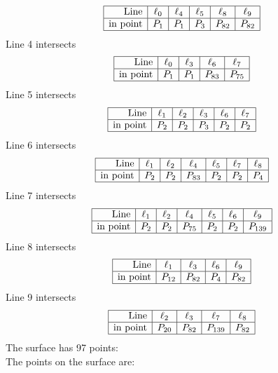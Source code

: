 \documentclass{article}
\begin{document}
{$$\begin{array}{|r*{5}{|c}|}
\hline
\mbox{Line}  & \ell_{0} & \ell_{4} & \ell_{5} & \ell_{8} & \ell_{9}\\
\hline
\mbox{in point}  & P_{1} & P_{1} & P_{3} & P_{82} & P_{82}\\
\hline
\end{array}
$$
Line 4 intersects 
$$
\begin{array}{|r*{4}{|c}|}
\hline
\mbox{Line}  & \ell_{0} & \ell_{3} & \ell_{6} & \ell_{7}\\
\hline
\mbox{in point}  & P_{1} & P_{1} & P_{83} & P_{75}\\
\hline
\end{array}
$$
Line 5 intersects 
$$
\begin{array}{|r*{5}{|c}|}
\hline
\mbox{Line}  & \ell_{1} & \ell_{2} & \ell_{3} & \ell_{6} & \ell_{7}\\
\hline
\mbox{in point}  & P_{2} & P_{2} & P_{3} & P_{2} & P_{2}\\
\hline
\end{array}
$$
Line 6 intersects 
$$
\begin{array}{|r*{6}{|c}|}
\hline
\mbox{Line}  & \ell_{1} & \ell_{2} & \ell_{4} & \ell_{5} & \ell_{7} & \ell_{8}\\
\hline
\mbox{in point}  & P_{2} & P_{2} & P_{83} & P_{2} & P_{2} & P_{4}\\
\hline
\end{array}
$$
Line 7 intersects 
$$
\begin{array}{|r*{6}{|c}|}
\hline
\mbox{Line}  & \ell_{1} & \ell_{2} & \ell_{4} & \ell_{5} & \ell_{6} & \ell_{9}\\
\hline
\mbox{in point}  & P_{2} & P_{2} & P_{75} & P_{2} & P_{2} & P_{139}\\
\hline
\end{array}
$$
Line 8 intersects 
$$
\begin{array}{|r*{4}{|c}|}
\hline
\mbox{Line}  & \ell_{1} & \ell_{3} & \ell_{6} & \ell_{9}\\
\hline
\mbox{in point}  & P_{12} & P_{82} & P_{4} & P_{82}\\
\hline
\end{array}
$$
Line 9 intersects 
$$
\begin{array}{|r*{4}{|c}|}
\hline
\mbox{Line}  & \ell_{2} & \ell_{3} & \ell_{7} & \ell_{8}\\
\hline
\mbox{in point}  & P_{20} & P_{82} & P_{139} & P_{82}\\
\hline
\end{array}
$$
The surface has 97 points:\\
The points on the surface are:\\
}
\end{document}
